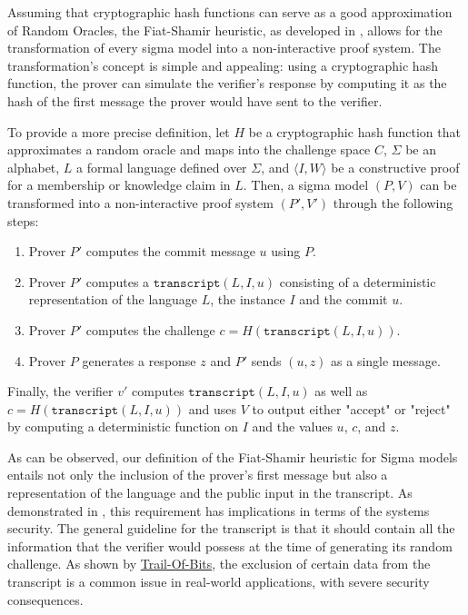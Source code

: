 Assuming that cryptographic hash functions can serve as a good approximation of Random Oracles, the Fiat-Shamir heuristic, as developed in \cite{fiat-86}, allows for the transformation of every sigma model into a non-interactive proof system.
The transformation's concept is simple and appealing: using a cryptographic hash function, the prover can simulate the verifier's response by computing it as the hash of the first message the prover would have sent to the verifier.

To provide a more precise definition, let $H$ be a cryptographic hash function that approximates a random oracle and maps into the challenge space $C$, $\Sigma$ be an alphabet, $L$ a formal language defined over $\Sigma$, and $\langle I, W\rangle$ be a constructive proof for a membership or knowledge claim in $L$. Then, a sigma model $(P,V)$ can be transformed into a non-interactive proof system $(P',V')$ through the following steps:
\begin{enumerate}
\label{def_sigma-model-fiat-shamir}
\item Prover $P'$ computes the commit message $u$ using $P$.
\item Prover $P'$ computes a $\mathtt{transcript}(L,I,u)$ consisting of a deterministic representation of the language $L$, the instance $I$ and the commit $u$.
\item Prover $P'$ computes the challenge $c=H(\mathtt{transcript}(L,I,u))$.
\item Prover $P$ generates a response $z$ and $P'$ sends $(u,z)$ as a single message.
\end{enumerate}
Finally, the verifier $v'$ computes $\mathtt{transcript}(L,I,u)$ as well as $c=H(\mathtt{transcript}(L,I,u))$ and uses $V$ to output either "accept" or "reject" by computing a deterministic function on $I$ and the values $u$, $c$, and $z$.

As can be observed, our definition of the Fiat-Shamir heuristic for Sigma models entails not only the inclusion of the prover's first message but also a representation of the language and the public input in the transcript. As demonstrated in \cite{bernhard-16}, this requirement has implications in terms of the systems security. The general guideline for the transcript is that it should contain all the information that the verifier would possess at the time of generating its random challenge. As shown by \href{https://blog.trailofbits.com/2022/04/18/the-frozen-heart-vulnerability-in-plonk/}{Trail-Of-Bits}, the exclusion of certain data from the transcript is a common issue in real-world applications, with severe security consequences.

